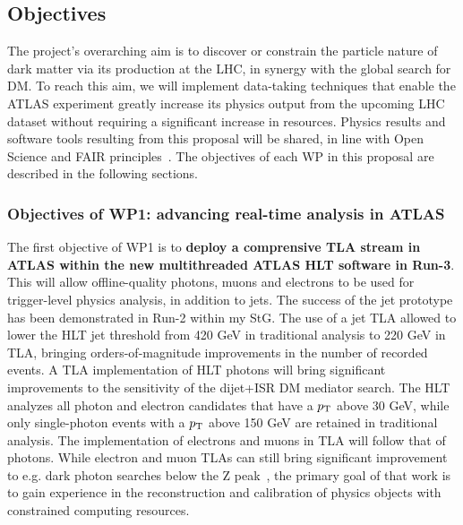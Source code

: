 \subsection{Objectives}
\label{sub:objectives}
\smallskip

The project's overarching aim is to discover or constrain the particle nature of dark matter via its production at the LHC, 
in synergy with the global search for DM. 
To reach this aim, we will implement data-taking techniques that enable the ATLAS experiment greatly increase its physics output from the upcoming LHC dataset without requiring a significant increase in resources. 
Physics results and software tools resulting from this proposal will be shared, in line with Open Science and FAIR principles~\cite{FAIR}.
The objectives of each WP in this proposal are described in the following sections. 


\subsubsection{Objectives of WP1: advancing real-time analysis in ATLAS}

The first objective of WP1 is to \textbf{deploy a comprensive TLA stream in ATLAS within the new multithreaded ATLAS HLT software in Run-3}. %
This will allow offline-quality photons, muons and electrons to be used for trigger-level physics analysis, in addition to jets. 
The success of the jet prototype has been demonstrated in Run-2 within my StG. 
The use of a jet TLA allowed to lower the HLT jet threshold from 420 GeV in traditional analysis to 220 GeV in TLA, bringing orders-of-magnitude improvements in the number of recorded events. 
A TLA implementation of HLT photons will bring significant improvements to the sensitivity of the dijet+ISR DM mediator search. 
The HLT analyzes all photon and electron candidates that have a $p_{\rm{T}}$ above 30 GeV, 
while only single-photon events with a $p_{\rm{T}}$ above 150 GeV are retained in traditional analysis. 
The implementation of electrons and muons in TLA will follow that of photons.
While electron and muon TLAs can still bring significant improvement to e.g. dark photon searches below the Z peak~\cite{Hoenig:2014dsa,Sirunyan:2019wqq}, %
the primary goal of that work is to gain experience in the reconstruction and calibration of physics objects with constrained computing resources. 

